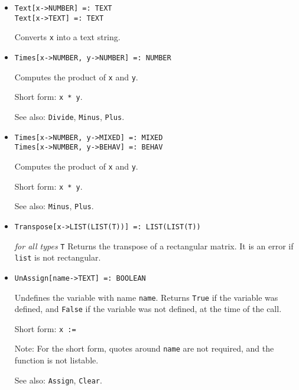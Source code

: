 \begin{itemize}

\item{}
\protect \large \begin{verbatim}
Text[x->NUMBER] =: TEXT 
Text[x->TEXT] =: TEXT 
\end{verbatim} \normalsize

\bd
Converts \verb+x+ into a text string.
\ed

\item{} 
\protect \large \begin{verbatim}
Times[x->NUMBER, y->NUMBER] =: NUMBER 
\end{verbatim} \normalsize

\bd
Computes the product of \verb+x+ and \verb+y+.
\item [Short form:] \verb+x * y+.
\item [See also:] \verb+Divide+, \verb+Minus+, \verb+Plus+.
\ed

\item{}
\protect \large \begin{verbatim}
Times[x->NUMBER, y->MIXED] =: MIXED 
Times[x->NUMBER, y->BEHAV] =: BEHAV 
\end{verbatim} \normalsize

\bd
Computes the product of \verb+x+ and \verb+y+.
\item [Short form:] \verb+x * y+.
\item [See also:] \verb+Minus+, \verb+Plus+.
\ed

\item{}
\protect \large \begin{verbatim} 
Transpose[x->LIST(LIST(T))] =: LIST(LIST(T)) 
\end{verbatim}\normalsize

{\it for all types} {\tt T}
\bd
Returns the transpose of a rectangular matrix.  It is an error if \verb+list+
is not rectangular.
\ed



\item{}
\protect \large \begin{verbatim}
UnAssign[name->TEXT] =: BOOLEAN
\end{verbatim}\normalsize

\bd
Undefines the variable with name \verb+name+.  Returns 
\verb+True+ if the variable was defined, and \verb+False+ if the
variable was not defined, at the time of the call.
\item [Short form:] \verb+x := +
\item [Note:] For the short form, quotes around \verb+name+ are not
required, and the function is not listable.
\item [See also:] \verb+Assign+, \verb+Clear+.
\ed


\end{itemize}
